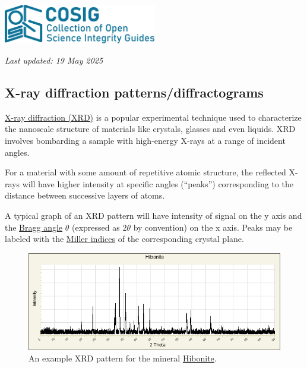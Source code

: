 \documentclass[letterpaper, 12pt]{article}
\begin{document}
\flushleft\includegraphics[width=0.5\textwidth]{img/home/241017_final_logo_mockup.png}

\textit{Last updated: 19 May 2025}

\subsection*{X-ray diffraction patterns/diffractograms}

\href{https://web.pdx.edu/~pmoeck/phy381/Topic5a-XRD.pdf}{X-ray diffraction (XRD)} is a popular experimental technique used to characterize the nanoscale structure of materials like crystals, glasses and even liquids. XRD involves bombarding a sample with high-energy X-rays at a range of incident angles.

For a material with some amount of repetitive atomic structure, the reflected X-rays will have higher intensity at specific angles (``peaks'') corresponding to the distance between successive layers of atoms.

A typical graph of an XRD pattern will have intensity of signal on the y axis and the \href{https://en.wikipedia.org/wiki/Bragg%27s_law}{Bragg angle} $\theta$
(expressed as $2\theta$ by convention) on the x axis. Peaks may be labeled with the \href{https://chem.libretexts.org/Courses/Lafayette_College/CHEM_212_213%3A_Inorganic_Chemistry_(Nataro)/03%3A_Solid_state/3.10%3A_Miller_Indices_(hkl)}{Miller indices} of the corresponding crystal plane.

\begin{figure}[h!tbp]
    \includegraphics[width=\textwidth]{img/xrd/powder__2857__1486.png}
    \caption*{An example XRD pattern for the mineral \href{https://rruff.info/R061069}{Hibonite}.}
\end{figure}
\end{document}
